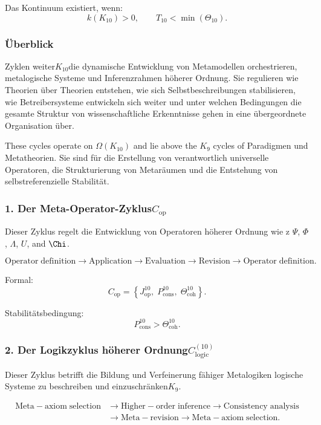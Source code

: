 Das Kontinuum existiert, wenn:
\[
  k(K_{10})>0,\qquad T_{10} < \min(\Theta_{10}).
\]


\subsubsection{Überblick}

Zyklen weiter$K_{10}$die dynamische Entwicklung von Metamodellen orchestrieren,
metalogische Systeme und Inferenzrahmen höherer Ordnung. Sie regulieren
wie Theorien über Theorien entstehen, wie sich Selbstbeschreibungen stabilisieren, wie
Betreibersysteme entwickeln sich weiter und unter welchen Bedingungen die gesamte Struktur von
wissenschaftliche Erkenntnisse gehen in eine übergeordnete Organisation über.

These cycles operate on $\Omega(K_{10})$ and lie above the $K_9$ cycles of
Paradigmen und Metatheorien. Sie sind für die Erstellung von verantwortlich
universelle Operatoren, die Strukturierung von Metaräumen und die Entstehung von
selbstreferenzielle Stabilität.


\subsubsection{1. Der Meta-Operator-Zyklus$C_{\mathrm{op}}$}

Dieser Zyklus regelt die Entwicklung von Operatoren höherer Ordnung wie z
$\Psi$, $\Phi$, $\Lambda$, $U$, and $\Chi$.

\[
  \mathrm{Operator\;definition}
  \to
  \mathrm{Application}
  \to
  \mathrm{Evaluation}
  \to
  \mathrm{Revision}
  \to
  \mathrm{Operator\;definition}.
\]

Formal:
\[
  C_{\mathrm{op}}
  =
  \left\{
    J^{10}_{\mathrm{op}},\;
    P^{10}_{\mathrm{cons}},\;
    \Theta^{10}_{\mathrm{coh}}
  \right\}.
\]

Stabilitätsbedingung:
\[
  P^{10}_{\mathrm{cons}} > \Theta^{10}_\mathrm{coh}.
\]


\subsubsection{2. Der Logikzyklus höherer Ordnung$C_{\mathrm{logic}}^{(10)}$}

Dieser Zyklus betrifft die Bildung und Verfeinerung fähiger Metalogiken
logische Systeme zu beschreiben und einzuschränken$K_9$.

\[
  \begin{aligned}
  \mathrm{Meta\!-\!axiom\;selection}
  &\to \mathrm{Higher\!-\!order\;inference}
  \to \mathrm{Consistency\;analysis}\\
  &\to \mathrm{Meta\!-\!revision}
  \to \mathrm{Meta\!-\!axiom\;selection}.
  \end{aligned}
\]

